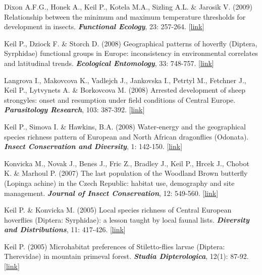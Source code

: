 \begin{etaremune}
\item Dixon A.F.G., Honek A., Keil P., Kotela M.A., Sizling A.L. \& Jarosik V. (2009) Relationship between the minimum and maximum temperature thresholds for development in insects. \textit{\textbf{Functional Ecology}}, 23: 257-264. [\href{http://onlinelibrary.wiley.com/doi/10.1111/j.1365-2435.2008.01489.x/abstract}{link}]

\item Keil P., Dziock F. \& Storch D. (2008) Geographical patterns of hoverfly (Diptera, Syrphidae) functional groups in Europe: inconsistency in environmental correlates and latitudinal trends. \textit{\textbf{Ecological Entomology}}, 33: 748-757. [\href{http://onlinelibrary.wiley.com/doi/10.1111/j.1365-2311.2008.01032.x/abstract}{link}]

\item Langrova I., Makovcova K., Vadlejch J., Jankovska I., Petrtyl M., Fetchner J., Keil P., Lytvynets A. \& Borkovcova M. (2008) Arrested development of sheep strongyles: onset and resumption under field conditions of Central Europe. \textit{\textbf{Parasitology Research}}, 103: 387-392. [\href{http://link.springer.com/article/10.1007%2Fs00436-008-0984-6}{link}]

\item Keil P., Simova I. \& Hawkins, B.A. (2008) Water-energy and the geographical species richness pattern of European and North African dragonflies (Odonata). \textit{\textbf{Insect Conservation and Diversity}}, 1: 142-150. [\href{http://onlinelibrary.wiley.com/doi/10.1111/j.1752-4598.2008.00019.x/abstract}{link}]

\item Konvicka M., Novak J., Benes J., Fric Z., Bradley J., Keil P., Hrcek J., Chobot K. \& Marhoul P. (2007) The last population of the Woodland Brown butterfly (Lopinga achine) in the Czech Republic: habitat use, demography and site management. \textit{\textbf{Journal of Insect Conservation}}, 12: 549-560. [\href{http://link.springer.com/article/10.1007%2Fs10841-007-9087-4}{link}]

\item Keil P. \& Konvicka M. (2005) Local species richness of Central European hoverflies (Diptera: Syrphidae): a lesson taught by local faunal lists. \textit{\textbf{Diversity and Distributions}}, 11: 417-426. [\href{http://onlinelibrary.wiley.com/doi/10.1111/j.1366-9516.2005.00172.x/abstract}{link}]

\item Keil P. (2005) Microhabitat preferences of Stiletto-flies larvae (Diptera: Therevidae) in mountain primeval forest. \textit{\textbf{Studia Dipterologica}}, 12(1): 87-92. [\href{http://www.studia-dipt.de/con121.htm}{link}]
\end{etaremune}

